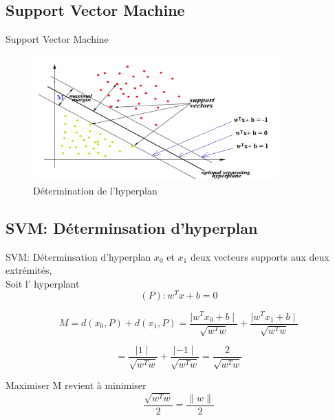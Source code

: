 \documentclass[xelatex,12pt]{beamer}
\begin{document}
\subsection{Support Vector Machine}
\begin{frame}{Support Vector Machine}
	\begin{figure}[H]
    \includegraphics[width=\linewidth, height=4.8cm]{images/svm_separate.png}
    \caption{Détermination de l’hyperplan}
    \label{fig:L1}
\end{figure}
\end{frame}

\subsection{SVM: Déterminsation d'hyperplan}
\begin{frame}{SVM: Déterminsation d'hyperplan}
 $x_0$ et $x_1$ deux vecteurs supports aux deux extrémités,\\
Soit l' hyperplant $$(P): w^Tx+b=0$$

$$M = d(x_{0},P)+d(x_{1},P) = \frac{\mid{w^{T}x_{0}+b}\mid}{\sqrt{w^{T}w} } + \frac{\mid{w^{T}x_{1}+b}\mid}{\sqrt{w^{T}w} } $$

$$ = \frac{\mid{1}\mid}{\sqrt{w^{T}w} } + \frac{\mid{-1}\mid}{\sqrt{w^{T}w}} = \frac{2}{\sqrt{w^{T}w} }$$  
\par Maximiser M revient à minimiser $$\frac{\sqrt{w^{T}w}}{2} = \frac{\|w\|}{2}$$
\end{frame}
\end{document}
